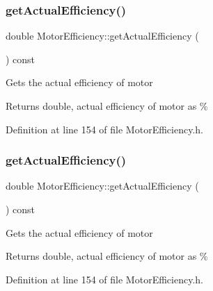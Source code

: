 \subsubsection{\texorpdfstring{get\+Actual\+Efficiency()}{getActualEfficiency()}\hspace{0.1cm}{\footnotesize\ttfamily [1/3]}}
{\footnotesize\ttfamily double Motor\+Efficiency\+::get\+Actual\+Efficiency (\begin{DoxyParamCaption}{ }\end{DoxyParamCaption}) const\hspace{0.3cm}{\ttfamily [inline]}}

Gets the actual efficiency of motor \begin{DoxyReturn}{Returns}
double, actual efficiency of motor as \% 
\end{DoxyReturn}


Definition at line 154 of file Motor\+Efficiency.\+h.

\mbox{\label{class_motor_efficiency_ae40031307b8631cf40df1c4069069dc0}} 
\subsubsection{\texorpdfstring{get\+Actual\+Efficiency()}{getActualEfficiency()}\hspace{0.1cm}{\footnotesize\ttfamily [2/3]}}
{\footnotesize\ttfamily double Motor\+Efficiency\+::get\+Actual\+Efficiency (\begin{DoxyParamCaption}{ }\end{DoxyParamCaption}) const\hspace{0.3cm}{\ttfamily [inline]}}

Gets the actual efficiency of motor \begin{DoxyReturn}{Returns}
double, actual efficiency of motor as \% 
\end{DoxyReturn}


Definition at line 154 of file Motor\+Efficiency.\+h.

\mbox{\label{class_motor_efficiency_ae40031307b8631cf40df1c4069069dc0}} 

